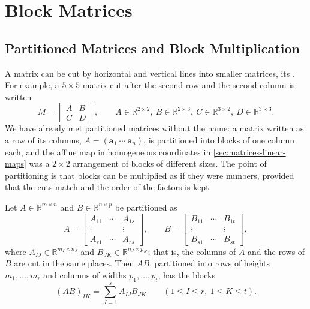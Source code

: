 \section{Block Matrices}
\label{sec:block-matrices}

\subsection{Partitioned Matrices and Block Multiplication}

A matrix can be cut by horizontal and vertical lines into smaller matrices, its . For example, a $5\times5$ matrix cut after the second row and the second column is written
\[
M=\begin{bmatrix}A&B\\C&D\end{bmatrix},\qquad A\in\mathbb R^{2\times2},\ B\in\mathbb R^{2\times3},\ C\in\mathbb R^{3\times2},\ D\in\mathbb R^{3\times3}.
\]
We have already met partitioned matrices without the name: a matrix written as a row of its columns, $A=(\mathbf a_1\ \cdots\ \mathbf a_n)$, is partitioned into blocks of one column each, and the affine map in homogeneous coordinates in \cref{sec:matrices-linear-maps} was a $2\times2$ arrangement of blocks of different sizes. The point of partitioning is that blocks can be multiplied as if they were numbers, provided that the cuts match and the order of the factors is kept.

\begin{theorem}
\label{thm:block-multiplication}
Let $A\in\mathbb R^{m\times n}$ and $B\in\mathbb R^{n\times p}$ be partitioned as
\[
A=\begin{bmatrix}A_{11}&\cdots&A_{1s}\\\vdots&&\vdots\\A_{r1}&\cdots&A_{rs}\end{bmatrix},\qquad B=\begin{bmatrix}B_{11}&\cdots&B_{1t}\\\vdots&&\vdots\\B_{s1}&\cdots&B_{st}\end{bmatrix},
\]
where $A_{IJ}\in\mathbb R^{m_I\times n_J}$ and $B_{JK}\in\mathbb R^{n_J\times p_K}$; that is, the columns of $A$ and the rows of $B$ are cut in the same places. Then $AB$, partitioned into rows of heights $m_1,\ldots,m_r$ and columns of widths $p_1,\ldots,p_t$, has the blocks
\[
(AB)_{IK}=\sum_{J=1}^sA_{IJ}B_{JK}\qquad(1\le I\le r,\ 1\le K\le t).
\]
\end{theorem}

